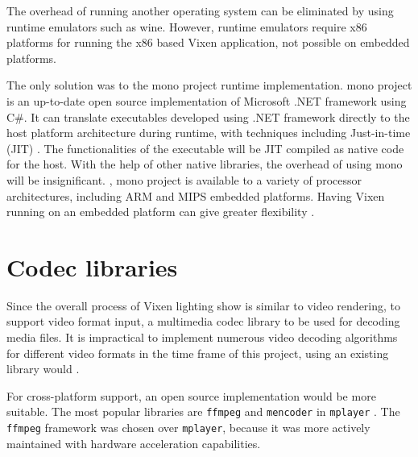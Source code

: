 The overhead of running another operating system can be eliminated by using runtime emulators such as wine. However, runtime emulators require x86 platforms for running the x86 based Vixen application,  not possible on  embedded platforms.

The only  solution was to  the mono project runtime implementation.  mono project is an up-to-date open source implementation of Microsoft .NET framework using C\#. It can translate executables developed using .NET framework directly to the host platform architecture during runtime, with techniques including Just-in-time (JIT) . The functionalities of the executable will be JIT compiled as native code for the host. With the help of other native libraries, the overhead of using mono will be insignificant. , mono project is available to a variety of processor architectures, including ARM and MIPS embedded platforms. Having Vixen running on an embedded platform can give greater flexibility .

\section{Codec libraries}

Since the overall process of  Vixen lighting show is similar to video rendering, to support video format input, a multimedia codec library  to be used for decoding media files. It is impractical to implement numerous video decoding algorithms for different video formats in the time frame of this project, using an existing library would .

For cross-platform support, an open source implementation would be more suitable. The most popular libraries are \texttt{ffmpeg} \cite{ffmpeg} and \texttt{mencoder} in \texttt{mplayer} \cite{mplayer}. The \texttt{ffmpeg} framework was chosen over \texttt{mplayer}, because it was more actively maintained with  hardware acceleration capabilities.


